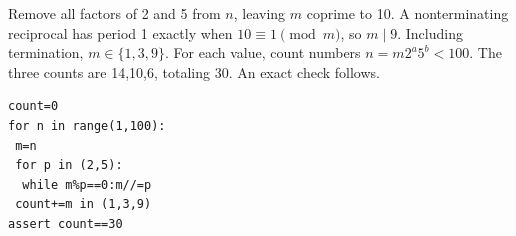 Remove all factors of 2 and 5 from $n$, leaving $m$ coprime to 10. A nonterminating reciprocal has period 1 exactly when $10\equiv1\pmod m$, so $m\mid9$. Including termination, $m\in\{1,3,9\}$. For each value, count numbers $n=m2^a5^b<100$. The three counts are 14,10,6, totaling $\boxed{30}$. An exact check follows.
\begin{verbatim}
count=0
for n in range(1,100):
 m=n
 for p in (2,5):
  while m%p==0:m//=p
 count+=m in (1,3,9)
assert count==30
\end{verbatim}
